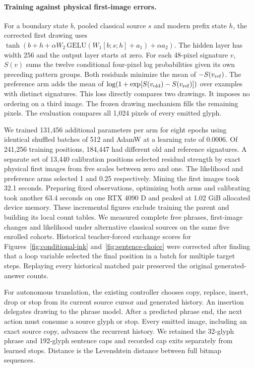\paragraph{Training against physical first-image errors.}
For a boundary state $b$, pooled classical source $s$ and modern prefix state $h$, the corrected first drawing uses $\tanh(b+h+\alpha W_2\,\mathrm{GELU}(W_1[b;s;h]+a_1)+\alpha a_2)$. The hidden layer has width 256 and the output layer starts at zero. For each 48-pixel signature $v$, $S(v)$ sums the twelve conditional four-pixel log probabilities given its own preceding pattern groups. Both residuals minimize the mean of $-S(v_{\rm ref})$. The preference arm adds the mean of $\log(1+\exp[S(v_{\rm old})-S(v_{\rm ref})])$ over examples with distinct signatures. This loss directly compares two drawings. It imposes no ordering on a third image. The frozen drawing mechanism fills the remaining pixels. The evaluation compares all 1,024 pixels of every emitted glyph.

We trained 131,456 additional parameters per arm for eight epochs using identical shuffled batches of 512 and AdamW at a learning rate of 0.0006. Of 241,256 training positions, 184,447 had different old and reference signatures. A separate set of 13,440 calibration positions selected residual strength by exact physical first images from five scales between zero and one. The likelihood and preference arms selected 1 and 0.25 respectively. Mining the first images took 32.1 seconds. Preparing fixed observations, optimizing both arms and calibrating took another 63.4 seconds on one RTX 4090 D and peaked at 1.02 GiB allocated device memory. These incremental figures exclude training the parent and building its local count tables. We measured complete free phrases, first-image changes and likelihood under alternative classical sources on the same five enrolled cohorts. Historical teacher-forced exchange scores for Figures~\ref{fig:conditional-ink} and~\ref{fig:sentence-choice} were corrected after finding that a loop variable selected the final position in a batch for multiple target steps. Replaying every historical matched pair preserved the original generated-answer counts.

For autonomous translation, the existing controller chooses copy, replace, insert, drop or stop from its current source cursor and generated history. An insertion delegates drawing to the phrase model. After a predicted phrase end, the next action must consume a source glyph or stop. Every emitted image, including an exact source copy, advances the recurrent history. We retained the 32-glyph phrase and 192-glyph sentence caps and recorded cap exits separately from learned stops. Distance is the Levenshtein distance between full bitmap sequences.


